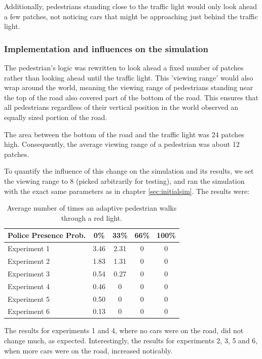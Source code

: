 \documentclass[a4paper]{article}
\begin{document}
Additionally, pedestrians standing close to the traffic light would only look ahead a few patches, not noticing cars that might be approaching just behind the traffic light.

\subsubsection{Implementation and influences on the simulation}
The pedestrian's logic was rewritten to look ahead a fixed number of patches rather than looking ahead until the traffic light. This 'viewing range' would also wrap around the world, meaning the viewing range of pedestrians standing near the top of the road also covered part of the bottom of the road. This ensures that all pedestrians regardless of their vertical position in the world observed an equally sized portion of the road.

The area between the bottom of the road and the traffic light was 24 patches high. Consequently, the average viewing range of a pedestrian was about 12 patches.

To quantify the influence of this change on the simulation and its results, we set the viewing range to 8 (picked arbitrarily for testing), and ran the simulation with the exact same parameters as in chapter \ref{sec:initialsim}. The results were:

\begin{table}[H]
\centering
\begin{tabular}{ l | c c c c }
  Police Presence Prob. & 0\% & 33\% & 66\% & 100\% \\ 
  \hline
  Experiment 1 & 3.46 & 2.31 & 0 & 0  \\
  Experiment 2 & 1.83 & 1.31 & 0 & 0  \\
  Experiment 3 & 0.54 & 0.27 & 0 & 0  \\
  Experiment 4 & 0.46 & 0    & 0 & 0  \\
  Experiment 5 & 0.50 & 0    & 0 & 0  \\
  Experiment 6 & 0.13 & 0    & 0 & 0  \\
\end{tabular}
\caption{Average number of times an adaptive 
pedestrian walks through a red light.}
\end{table}

The results for experiments 1 and 4, where no cars were on the road, did not change much, as expected. Interestingly, the results for experiments 2, 3, 5 and 6, when more cars were on the road, increased noticably. 
\end{document}
